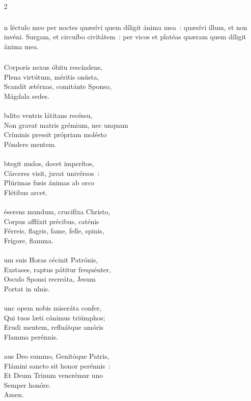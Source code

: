\documentclass[9pt,twoside]{extarticle}
\begin{document}
\begin{multicols}{2}
{{{\subsubsection*{}
n léctulo meo per noctes quæsívi quem díligit ánima mea~: quæsívi illum, et non invéni. Surgam, et circuíbo civitátem~: per vicos et platéas quæram quem díligit ánima mea.

\subsubsection*{\center {}}
\lettrine{C}orporis nexus óbitu rescíndens,\\
Plena virtútum, méritis onústa,\\
Scandit ætérnas, comitánte Sponso,\\
Mágdala sedes.\\
\\
bdito ventris látitans recéssu,\\
Non gravat matris grémium, nec unquam\\
Críminis pressit própriam molésto\\
Póndere mentem.\\
\\
btegit nudos, docet imperítos,\\
Cárceres visit, juvat univérsos~:\\
Plúrimas fusis ánimas ab orco\\
Flétibus arcet.\\
\\
éserens mundum, crucifíxa Christo,\\
Corpus afflíxit précibus, caténis\\
Férreis, flagris, fame, felle, spinis,\\
Frígore, flamma.\\
\\
um suis Horas cécinit Patrónis,\\
Exstases, raptus pátitur frequénter,\\
Osculo Sponsi recreáta, Jesum\\
Portat in ulnis.\\
\\
unc opem nobis miseráta confer,\\
Qui tuos læti cánimus triúmphos;\\
Erudi mentem, refluátque amóris\\
Flamma perénnis.\\
\\
aus Deo summo, Genitóque Patris,\\
Flámini sancto sit honor perénnis~:\\
Et Deum Trinum venerémur uno\\
Semper honóre.\\
Amen.

}}}
\end{multicols}
\end{document}
